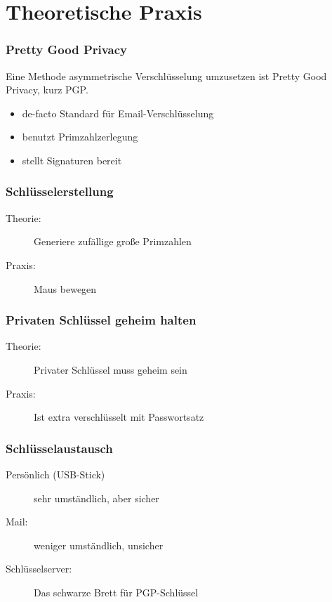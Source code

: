\documentclass[compress]{beamer}
\begin{document}
\section{Theoretische Praxis}
\label{sec-1-1-4}

\begin{frame}
    \frametitle{Pretty Good Privacy}
    Eine Methode asymmetrische Verschlüsselung umzusetzen ist
    \alert{P}retty \alert{G}ood \alert{P}rivacy, kurz PGP.
    \begin{itemize}
        \item de-facto Standard für Email-Verschlüsselung
        \item benutzt Primzahlzerlegung
        \item stellt Signaturen bereit
    \end{itemize}
\end{frame}
\begin{frame}
    \frametitle{Schlüsselerstellung}
    \begin{description}
        \item[Theorie:] Generiere zufällige große Primzahlen
        \item[Praxis:] Maus bewegen
    \end{description}
\end{frame}
\begin{frame}
    \frametitle{Privaten Schlüssel geheim halten}
    \begin{description}
        \item[Theorie:] Privater Schlüssel muss geheim sein
        \item[Praxis:] Ist extra verschlüsselt mit \alert{Passwortsatz}
    \end{description}
\end{frame}
\begin{frame}
    \frametitle{Schlüsselaustausch}
    \begin{description}
        \item[Persönlich (USB-Stick)] sehr umständlich, aber sicher
        \item[Mail:] weniger umständlich, unsicher
        \item[Schlüsselserver:] Das schwarze Brett für PGP-Schlüssel
    \end{description}
\end{frame}
\end{document}
